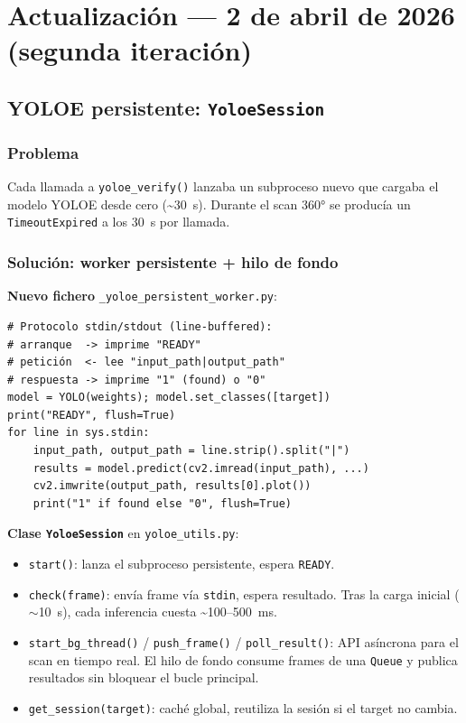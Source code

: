 \documentclass[11pt,a4paper]{article}
\begin{document}
\section{Actualización — 2 de abril de 2026 (segunda iteración)}

\subsection{YOLOE persistente: \texttt{YoloeSession}}

\subsubsection*{Problema}
Cada llamada a \texttt{yoloe\_verify()} lanzaba un subproceso nuevo que cargaba
el modelo YOLOE desde cero (\textasciitilde30~s). Durante el scan 360° se
producía un \texttt{TimeoutExpired} a los 30~s por llamada.

\subsubsection*{Solución: worker persistente + hilo de fondo}

\textbf{Nuevo fichero} \texttt{\_yoloe\_persistent\_worker.py}:
\begin{verbatim}
# Protocolo stdin/stdout (line-buffered):
# arranque  -> imprime "READY"
# petición  <- lee "input_path|output_path"
# respuesta -> imprime "1" (found) o "0"
model = YOLO(weights); model.set_classes([target])
print("READY", flush=True)
for line in sys.stdin:
    input_path, output_path = line.strip().split("|")
    results = model.predict(cv2.imread(input_path), ...)
    cv2.imwrite(output_path, results[0].plot())
    print("1" if found else "0", flush=True)
\end{verbatim}

\textbf{Clase \texttt{YoloeSession}} en \texttt{yoloe\_utils.py}:
\begin{itemize}
  \item \texttt{start()}: lanza el subproceso persistente, espera \texttt{READY}.
  \item \texttt{check(frame)}: envía frame vía \texttt{stdin}, espera resultado.
        Tras la carga inicial ($\sim$10~s), cada inferencia cuesta
        \textasciitilde100--500~ms.
  \item \texttt{start\_bg\_thread()} / \texttt{push\_frame()} /
        \texttt{poll\_result()}: API asíncrona para el scan en tiempo real.
        El hilo de fondo consume frames de una \texttt{Queue} y publica
        resultados sin bloquear el bucle principal.
  \item \texttt{get\_session(target)}: caché global, reutiliza la sesión si
        el target no cambia.
\end{itemize}
\end{document}
